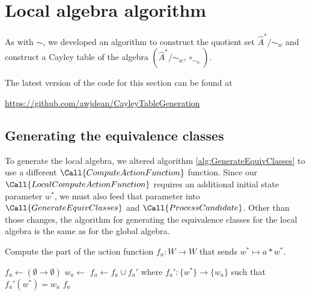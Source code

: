 \section{Local algebra algorithm}

As with $\sim$, we developed an algorithm to construct the quotient set $\hat{A}^{*}/\sim_{w}$ and construct a Cayley table of the algebra $(\hat{A}^{*}/\sim_{w}, \circ_{\sim_{w}})$.

The latest version of the code for this section can be found at
\begin{center}
\url{https://github.com/awjdean/CayleyTableGeneration}
\end{center}

\subsection{Generating the equivalence classes}

To generate the local algebra, we altered algorithm \ref{alg:GenerateEquivClasses} to use a different $\Call{ComputeActionFunction}$ function.
Since our $\Call{LocalComputeActionFunction}$ requires an additional initial state parameter $w^{*}$, we must also feed that parameter into $\Call{GenerateEquivClasses}$ and $\Call{ProcessCandidate}$.
Other than those changes, the algorithm for generating the equivalence classes for the local algebra is the same as for the global algebra.

\begin{algorithm}[H]
	\caption{
		Compute the part of the action function $f_{a}: W \to W$ that sends $w^{*} \mapsto a \ast w^{*}$.
	}
    \label{alg:LocalComputeActionFunction}
	\hrulefill
	\begin{algorithmic}[1]
		\State $f_{a} \gets (\emptyset \to \emptyset)$
		\State $w_{a} \gets$ 
		\State $f_{a} \gets f_{a} \cup f_{a}'$ where $f_{a}': \{w^{*}\} \to \{w_{a}\}$ such that $f_{a}'(w^{*}) = w_{a}$
		\State \Return $f_{a}$
		\EndProcedure
	\end{algorithmic}
\end{algorithm}

